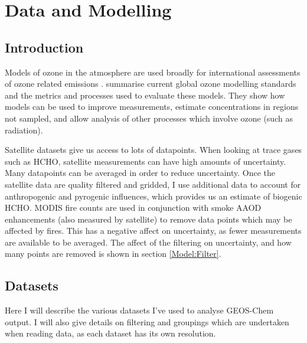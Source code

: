 
\chapter{Data and Modelling} %
\label{Model} %
  
\section{Introduction}
  Models of ozone in the atmosphere are used broadly for international assessments of ozone related emissions \parencite{Young2018}.
  \textcite{Young2018} summarise current global ozone modelling standards and the metrics and processes used to evaluate these models.
  They show how models can be used to improve measurements, estimate concentrations in regions not sampled, and allow analysis of other processes which involve ozone (such as radiation).
  
  Satellite datasets give us access to lots of datapoints.
  When looking at trace gases such as HCHO, satellite measurements can have high amounts of uncertainty.
  Many datapoints can be averaged in order to reduce uncertainty.
  Once the satellite data are quality filtered and gridded, I use additional data to account for anthropogenic and pyrogenic influences, which provides us an estimate of biogenic HCHO.
  MODIS fire counts are used in conjunction with smoke AAOD enhancements (also measured by satellite) to remove data points which may be affected by fires. 
  This has a negative affect on uncertainty, as fewer measurements are available to be averaged. 
  The affect of the filtering on uncertainty, and how many points are removed is shown in section \ref{Model:Filter}.

\section{Datasets}
\label{Model:Datasets}

  Here I will describe the various datasets I've used to analyse GEOS-Chem output.
  I will also give details on filtering and groupings which are undertaken when reading data, as each dataset has its own resolution.
  
